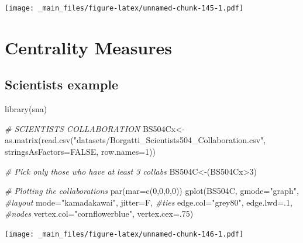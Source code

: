 \documentclass[
  notitlepage,
  onecolumn,
  openany]{book}
\newenvironment{Shaded}{\begin{snugshade}}{\end{snugshade}}
\newcommand{\AttributeTok}[1]{\textcolor[rgb]{0.77,0.63,0.00}{#1}}
\newcommand{\CommentTok}[1]{\textcolor[rgb]{0.56,0.35,0.01}{\textit{#1}}}
\newcommand{\ConstantTok}[1]{\textcolor[rgb]{0.00,0.00,0.00}{#1}}
\newcommand{\DecValTok}[1]{\textcolor[rgb]{0.00,0.00,0.81}{#1}}
\newcommand{\FunctionTok}[1]{\textcolor[rgb]{0.00,0.00,0.00}{#1}}
\newcommand{\NormalTok}[1]{#1}
\newcommand{\OtherTok}[1]{\textcolor[rgb]{0.56,0.35,0.01}{#1}}
\newcommand{\SpecialCharTok}[1]{\textcolor[rgb]{0.00,0.00,0.00}{#1}}
\newcommand{\StringTok}[1]{\textcolor[rgb]{0.31,0.60,0.02}{#1}}
\begin{document}
\texttt{[image: \_main\_files/figure-latex/unnamed-chunk-145-1.pdf]}

\hypertarget{centrality-measures}{%
\chapter{Centrality Measures}\label{centrality-measures}}

\hypertarget{scientists-example}{%
\section{Scientists example}\label{scientists-example}}

\begin{Shaded}
\begin{Highlighting}[]
\FunctionTok{library}\NormalTok{(sna)}

\CommentTok{\# SCIENTISTS COLLABORATION}
\NormalTok{BS504Cx}\OtherTok{\textless{}{-}}\FunctionTok{as.matrix}\NormalTok{(}\FunctionTok{read.csv}\NormalTok{(}\StringTok{"datasets/Borgatti\_Scientists504\_Collaboration.csv"}\NormalTok{,}
                            \AttributeTok{stringsAsFactors=}\ConstantTok{FALSE}\NormalTok{, }\AttributeTok{row.names=}\DecValTok{1}\NormalTok{))}

\CommentTok{\# Pick only those who have at least 3 collabs}
\NormalTok{BS504C}\OtherTok{\textless{}{-}}\NormalTok{(BS504Cx}\SpecialCharTok{\textgreater{}}\DecValTok{3}\NormalTok{)}

\CommentTok{\# Plotting the collaborations}
\FunctionTok{par}\NormalTok{(}\AttributeTok{mar=}\FunctionTok{c}\NormalTok{(}\DecValTok{0}\NormalTok{,}\DecValTok{0}\NormalTok{,}\DecValTok{0}\NormalTok{,}\DecValTok{0}\NormalTok{))}
\FunctionTok{gplot}\NormalTok{(BS504C, }
      \AttributeTok{gmode=}\StringTok{"graph"}\NormalTok{,}
      \CommentTok{\#layout}
      \AttributeTok{mode=}\StringTok{"kamadakawai"}\NormalTok{,}
      \AttributeTok{jitter=}\NormalTok{F,}
      \CommentTok{\#ties}
      \AttributeTok{edge.col=}\StringTok{"grey80"}\NormalTok{, }
      \AttributeTok{edge.lwd=}\NormalTok{.}\DecValTok{1}\NormalTok{,}
      \CommentTok{\#nodes}
      \AttributeTok{vertex.col=}\StringTok{"cornflowerblue"}\NormalTok{,}
      \AttributeTok{vertex.cex=}\NormalTok{.}\DecValTok{75}\NormalTok{)}
\end{Highlighting}
\end{Shaded}

\texttt{[image: \_main\_files/figure-latex/unnamed-chunk-146-1.pdf]}
\end{document}
